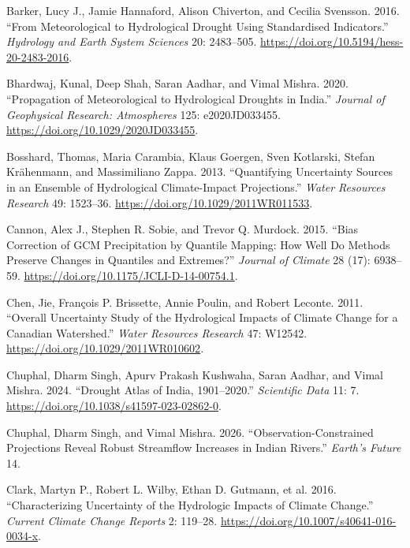 \documentclass[
  english,
  11pt,
]{article}
\newlength{\cslhangindent}
\newenvironment{CSLReferences}[2] %
 {\begin{list}{}{%
  \setlength{\itemindent}{0pt}
  \setlength{\leftmargin}{0pt}
  \setlength{\parsep}{0pt}
  \ifodd #1
   \setlength{\leftmargin}{\cslhangindent}
   \setlength{\itemindent}{-1\cslhangindent}
  \fi
  \setlength{\itemsep}{#2\baselineskip}}}
 {\end{list}}
\begin{document}
\protect{}\label{refs}
\begin{CSLReferences}{1}{1}
Barker, Lucy J., Jamie Hannaford, Alison Chiverton, and Cecilia
Svensson. 2016. {``From Meteorological to Hydrological Drought Using
Standardised Indicators.''} \emph{Hydrology and Earth System Sciences}
20: 2483--505. \url{https://doi.org/10.5194/hess-20-2483-2016}.

Bhardwaj, Kunal, Deep Shah, Saran Aadhar, and Vimal Mishra. 2020.
{``Propagation of Meteorological to Hydrological Droughts in {India}.''}
\emph{Journal of Geophysical Research: Atmospheres} 125: e2020JD033455.
\url{https://doi.org/10.1029/2020JD033455}.

Bosshard, Thomas, Maria Carambia, Klaus Goergen, Sven Kotlarski, Stefan
Krähenmann, and Massimiliano Zappa. 2013. {``Quantifying Uncertainty
Sources in an Ensemble of Hydrological Climate-Impact Projections.''}
\emph{Water Resources Research} 49: 1523--36.
\url{https://doi.org/10.1029/2011WR011533}.

Cannon, Alex J., Stephen R. Sobie, and Trevor Q. Murdock. 2015. {``Bias
Correction of {GCM} Precipitation by Quantile Mapping: How Well Do
Methods Preserve Changes in Quantiles and Extremes?''} \emph{Journal of
Climate} 28 (17): 6938--59.
\url{https://doi.org/10.1175/JCLI-D-14-00754.1}.

Chen, Jie, François P. Brissette, Annie Poulin, and Robert Leconte.
2011. {``Overall Uncertainty Study of the Hydrological Impacts of
Climate Change for a {Canadian} Watershed.''} \emph{Water Resources
Research} 47: W12542. \url{https://doi.org/10.1029/2011WR010602}.

Chuphal, Dharm Singh, Apurv Prakash Kushwaha, Saran Aadhar, and Vimal
Mishra. 2024. {``Drought Atlas of {India}, 1901--2020.''}
\emph{Scientific Data} 11: 7.
\url{https://doi.org/10.1038/s41597-023-02862-0}.

Chuphal, Dharm Singh, and Vimal Mishra. 2026. {``Observation-Constrained
Projections Reveal Robust Streamflow Increases in {Indian} Rivers.''}
\emph{Earth's Future} 14.

{Clark, Martyn P., Robert L. Wilby, Ethan D. Gutmann, et al.} 2016.
{``Characterizing Uncertainty of the Hydrologic Impacts of Climate
Change.''} \emph{Current Climate Change Reports} 2: 119--28.
\url{https://doi.org/10.1007/s40641-016-0034-x}.


\end{CSLReferences}
\end{document}
